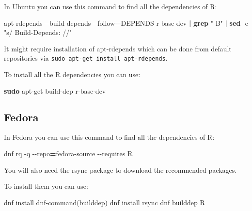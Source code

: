 \documentclass[
]{book}
\newenvironment{Shaded}{\begin{snugshade}}{\end{snugshade}}
\newcommand{\AttributeTok}[1]{\textcolor[rgb]{0.13,0.29,0.53}{#1}}
\newcommand{\ExtensionTok}[1]{#1}
\newcommand{\FunctionTok}[1]{\textcolor[rgb]{0.13,0.29,0.53}{\textbf{#1}}}
\newcommand{\KeywordTok}[1]{\textcolor[rgb]{0.13,0.29,0.53}{\textbf{#1}}}
\newcommand{\NormalTok}[1]{#1}
\newcommand{\OperatorTok}[1]{\textcolor[rgb]{0.81,0.36,0.00}{\textbf{#1}}}
\newcommand{\StringTok}[1]{\textcolor[rgb]{0.31,0.60,0.02}{#1}}
\begin{document}
In Ubuntu you can use this command to find all the dependencies of R:

\begin{Shaded}
\begin{Highlighting}[]
\ExtensionTok{apt{-}rdepends} \AttributeTok{{-}{-}build{-}depends} \AttributeTok{{-}{-}follow}\OperatorTok{=}\NormalTok{DEPENDS r{-}base{-}dev }\KeywordTok{|} \FunctionTok{grep} \StringTok{" B"} \KeywordTok{|} \FunctionTok{sed} \AttributeTok{{-}e} \StringTok{"s/  Build{-}Depends: //"}
\end{Highlighting}
\end{Shaded}

It might require installation of apt-rdepends which can be done from default repositories via \texttt{sudo\ apt-get\ install\ apt-rdepends}.

To install all the R dependencies you can use:

\begin{Shaded}
\begin{Highlighting}[]
\FunctionTok{sudo}\NormalTok{ apt{-}get build{-}dep r{-}base{-}dev}
\end{Highlighting}
\end{Shaded}

\subsection{Fedora}\label{fedora}

In Fedora you can use this command to find all the dependencies of R:

\begin{Shaded}
\begin{Highlighting}[]
\ExtensionTok{dnf}\NormalTok{ rq }\AttributeTok{{-}q} \AttributeTok{{-}{-}repo}\OperatorTok{=}\NormalTok{fedora{-}source }\AttributeTok{{-}{-}requires}\NormalTok{ R }
\end{Highlighting}
\end{Shaded}

You will also need the rsync package to download the recommended packages.

To install them you can use:

\begin{Shaded}
\begin{Highlighting}[]
\ExtensionTok{dnf}\NormalTok{ install }\StringTok{\textquotesingle{}dnf{-}command(builddep)\textquotesingle{}}
\ExtensionTok{dnf}\NormalTok{ install rsync}
\ExtensionTok{dnf}\NormalTok{ builddep R}
\end{Highlighting}
\end{Shaded}
\end{document}
